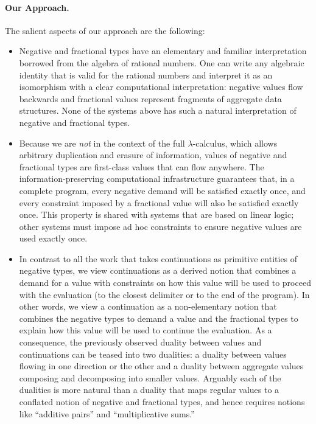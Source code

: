 \documentclass[preprint]{sigplanconf}
\begin{document}
{\paragraph*{Our Approach.} The salient aspects of our approach are the following:
\begin{itemize}
\item Negative and fractional types have an elementary and familiar
  interpretation borrowed from the algebra of rational numbers. One can write
  any algebraic identity that is valid for the rational numbers and interpret
  it as an isomorphism with a clear computational interpretation: negative
  values flow backwards and fractional values represent fragments of
  aggregate data structures. None of the systems above has such a natural
  interpretation of negative and fractional types. 
\item Because we are \emph{not} in the context of the full
  $\lambda$-calculus, which allows arbitrary duplication and erasure of
  information, values of negative and fractional types are first-class values
  that can flow anywhere. The information-preserving computational
  infrastructure guarantees that, in a complete program, every negative
  demand will be satisfied exactly once, and every constraint imposed by a
  fractional value will also be satisfied exactly once. This property is
  shared with systems that are based on linear logic; other systems must
  impose ad hoc constraints to ensure negative values are used exactly
  once. 
\item In contrast to all the work that takes continuations as primitive
  entities of negative types, we view continuations as a derived notion that
  combines a demand for a value with constraints on how this value will be
  used to proceed with the evaluation (to the closest delimiter or to the end
  of the program). In other words, we view a continuation as a non-elementary
  notion that combines the negative types to demand a value and the
  fractional types to explain how this value will be used to continue the
  evaluation. As a consequence, the previously observed duality between
  values and continuations can be teased into two dualities: a duality
  between values flowing in one direction or the other and a duality between
  aggregate values composing and decomposing into smaller values. Arguably
  each of the dualities is more natural than a duality that maps regular
  values to a conflated notion of negative and fractional types, and hence
  requires notions like ``additive pairs'' and ``multiplicative sums.''
\end{itemize}

}
\end{document}
